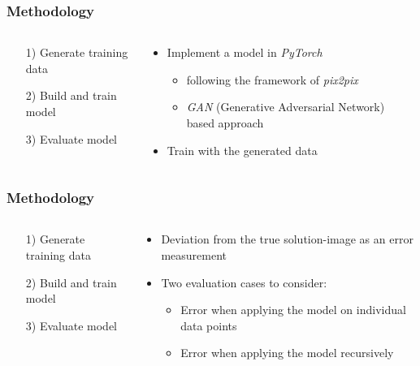 \documentclass[18pt]{beamer}
\newcommand{\semitransp}[2][35]{\color{fg!#1}#2 \color{fg}}
\begin{document}
\begin{frame}[t]
  \frametitle{Methodology}
  \begin{columns}[t]
    \begin{column}{0.4\textwidth}
      \begin{itemize}
      \item[1)] \semitransp{Generate training data}
      \item[2)] Build and train model
      \item[3)] \semitransp{Evaluate model}
      \end{itemize}
    \end{column}
    \begin{column}{0.6\textwidth}
      \begin{itemize}
      \item Implement a model in \textit{PyTorch}
        \begin{itemize}
          \item following the framework of \textit{pix2pix}
          \item \textit{GAN} (Generative Adversarial Network) based approach
          \end{itemize}
          \item Train with the generated data
      \end{itemize}
    \end{column}
  \end{columns}

\end{frame}


\begin{frame}[t]
  \frametitle{Methodology}
  \begin{columns}[t]
    \begin{column}{0.4\textwidth}
      \begin{itemize}
      \item[1)] \semitransp{Generate training data}
      \item[2)] \semitransp{Build and train model}
      \item[3)] Evaluate model
      \end{itemize}
    \end{column}
    \begin{column}{0.6\textwidth}
      \begin{itemize}
      \item Deviation from the true solution-image as an error measurement
      \item Two evaluation cases to consider:
        \begin{itemize}
        \item Error when applying the model on individual data points
        \item Error when applying the model recursively
        \end{itemize}
      \end{itemize}      
    \end{column}
  \end{columns}
\end{frame}
\end{document}

